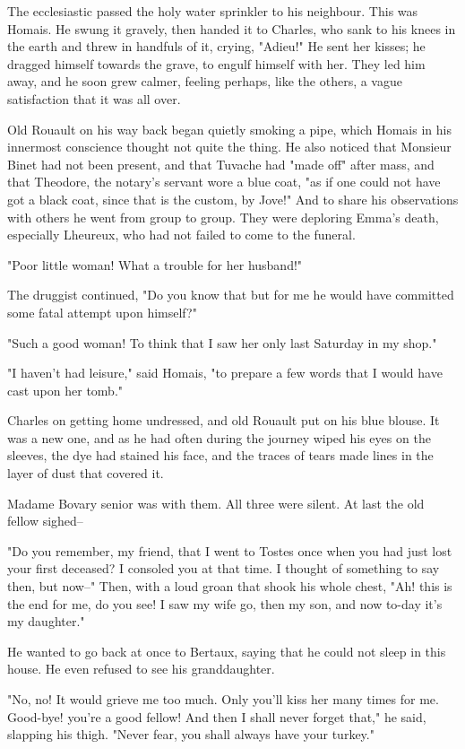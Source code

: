 \documentclass[11pt,twocolumn]{ltugboat}
\begin{document}
The ecclesiastic passed the holy water sprinkler to his neighbour. This
was Homais. He swung it gravely, then handed it to Charles, who sank to
his knees in the earth and threw in handfuls of it, crying, "Adieu!" He
sent her kisses; he dragged himself towards the grave, to engulf himself
with her. They led him away, and he soon grew calmer, feeling perhaps,
like the others, a vague satisfaction that it was all over.

Old Rouault on his way back began quietly smoking a pipe, which Homais
in his innermost conscience thought not quite the thing. He also noticed
that Monsieur Binet had not been present, and that Tuvache had "made
off" after mass, and that Theodore, the notary's servant wore a blue
coat, "as if one could not have got a black coat, since that is the
custom, by Jove!" And to share his observations with others he went from
group to group. They were deploring Emma's death, especially Lheureux,
who had not failed to come to the funeral.

"Poor little woman! What a trouble for her husband!"

The druggist continued, "Do you know that but for me he would have
committed some fatal attempt upon himself?"

"Such a good woman! To think that I saw her only last Saturday in my
shop."

"I haven't had leisure," said Homais, "to prepare a few words that I
would have cast upon her tomb."

Charles on getting home undressed, and old Rouault put on his blue
blouse. It was a new one, and as he had often during the journey wiped
his eyes on the sleeves, the dye had stained his face, and the traces of
tears made lines in the layer of dust that covered it.

Madame Bovary senior was with them. All three were silent. At last the
old fellow sighed--

"Do you remember, my friend, that I went to Tostes once when you had
just lost your first deceased? I consoled you at that time. I thought of
something to say then, but now--" Then, with a loud groan that shook his
whole chest, "Ah! this is the end for me, do you see! I saw my wife go,
then my son, and now to-day it's my daughter."

He wanted to go back at once to Bertaux, saying that he could not sleep
in this house. He even refused to see his granddaughter.

"No, no! It would grieve me too much. Only you'll kiss her many times
for me. Good-bye! you're a good fellow! And then I shall never forget
that," he said, slapping his thigh. "Never fear, you shall always have
your turkey."
\end{document}
